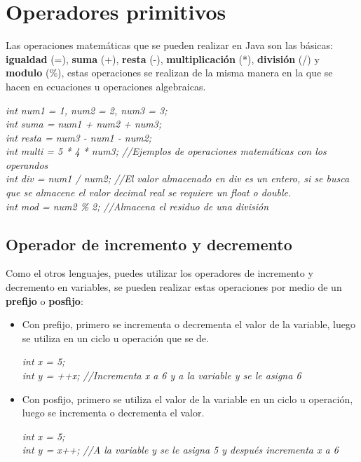 \section{Operadores primitivos}
Las operaciones matemáticas que se pueden realizar en Java son las básicas: \textbf{igualdad} (=), \textbf{suma} (+), \textbf{resta} (-), \textbf{multiplicación} (*), \textbf{división} (/) y \textbf{modulo} (\%), estas operaciones se realizan de la misma manera en la que se hacen en ecuaciones u operaciones algebraicas.
\begin{center}
    \textit{int num1 = 1, num2 = 2, num3 = 3;\\int suma = num1 + num2 + num3;\\int resta = num3 - num1 - num2;\\int multi = 5 * 4 * num3; //Ejemplos de operaciones matemáticas con los operandos\\int div = num1 / num2; //El valor almacenado en div es un entero, si se busca que se almacene el valor decimal real se requiere un float o double.\\int mod = num2 \% 2; //Almacena el residuo de una división}
\end{center}

\subsection{Operador de incremento y decremento}
Como el otros lenguajes, puedes utilizar los operadores de incremento y decremento en variables, se pueden realizar estas operaciones por medio de un \textbf{prefijo} o \textbf{posfijo}:
\begin{itemize}
    \item Con prefijo, primero se incrementa o decrementa el valor de la variable, luego se utiliza en un ciclo u operación que se de.
    \begin{center}\textit{int x = 5;\\int y = ++x; //Incrementa x a 6 y a la variable y se le asigna 6}\end{center}
    \item Con posfijo, primero se utiliza el valor de la variable en un ciclo u operación, luego se incrementa o decrementa el valor.
    \begin{center}\textit{int x = 5;\\int y = x++; //A la variable y se le asigna 5 y después incrementa x a 6}\end{center}
\end{itemize}

